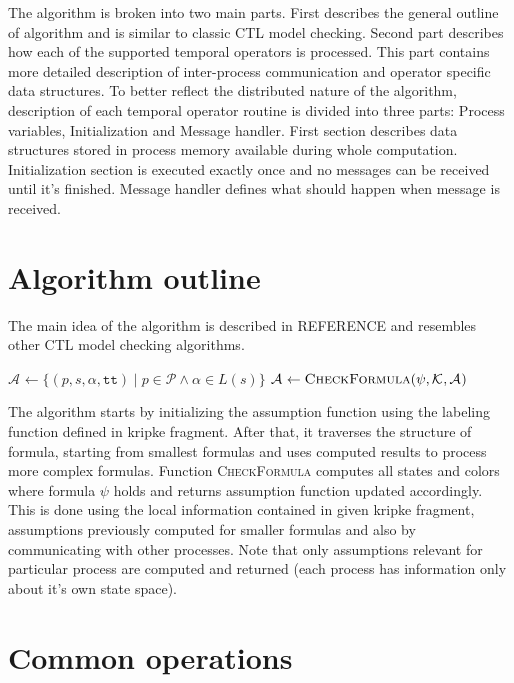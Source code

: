\documentclass[12pt,oneside,draft]{fithesis2}
\newcommand{\as}[1][]{\ensuremath{\mathcal{A}_{#1}}}
\newcommand{\method}[1]{\textnormal{\textsc{#1}}}
\newcommand{\true}{\ensuremath{\texttt{tt}}}
\newcommand{\ks}[1][]{\ensuremath{\mathcal{K}_{#1}}}
\newcommand{\fullKs}{\ensuremath{ \ks = (\params, S, S_0, \trans{}, L) }}
\newcommand{\trans}[1]{\stackrel{#1}{\rightarrow}}
\newcommand{\params}{\mathcal{P}}
\begin{document}
		The algorithm is broken into two main parts. First describes the general outline of algorithm and is similar to classic CTL model checking. Second part describes how each of the supported temporal operators is processed. This part contains more detailed description of inter-process communication and operator specific data structures. To better reflect the distributed nature of the algorithm, description of each temporal operator routine is divided into three parts: Process variables, Initialization and Message handler. First section describes data structures stored in process memory available during whole computation. Initialization section is executed exactly once and no messages can be received until it's finished. Message handler defines what should happen when message is received.  
		
		\section{Algorithm outline}
		
			The main idea of the algorithm is described in REFERENCE and resembles other CTL model checking algorithms.
			
			\begin{algorithmic}[1]
				\Procedure{CheckCTL}{$ \phi, \fullKs $}
					\State $ \as \gets \{ (p, s, \alpha, \true) \mid  p \in \params \wedge \alpha \in L(s) \}$ 
							\State $ \as \gets \Call{CheckFormula}{\psi, \ks, \as } $
						\EndFor
					\EndFor
				\EndProcedure			
			\end{algorithmic} 
			
			The algorithm starts by initializing the assumption function using the labeling function defined in kripke fragment. After that, it traverses the structure of formula, starting from smallest formulas and uses computed results to process more complex formulas. Function \method{CheckFormula} computes all states and colors where formula $\psi$ holds and returns assumption function updated accordingly. This is done using the local information contained in given kripke fragment, assumptions previously computed for smaller formulas and also by communicating with other processes. Note that only assumptions relevant for particular process are computed and returned (each process has information only about it's own state space).
    	
    	\section{Common operations}
    		
\end{document}
